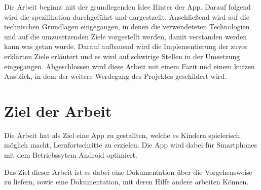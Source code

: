 Die Arbeit beginnt mit der grundlegenden Idee Hinter der App. Darauf folgend wird die spezifikation durchgeführt und dargestzellt. Anschließend wird auf die technischen Grundlagen eingegangen, in denen die verwendeteten Technologien und auf die umzusetzenden Ziele vorgestellt werden, damit verstanden werden kann was getan wurde. Darauf aufbauend wird die Implementierung der zuvor erklärten Ziele erläutert und es wird auf schwirige Stellen in der Umsetzung eingegangen. Abgeschlossen wird diese Arbeit mit einem Fazit und einem kurzen Ausblick, in dem der weitere Werdegang des Projektes geschildert wird.




\section{Ziel der Arbeit}%

Die Arbeit hat als Ziel eine App zu gestallten, welche es Kindern spielerisch möglich macht, Lernfortschritte zu erzielen. Die App wird dabei für Smartphones mit dem Betriebssytem Android optimiert.

Das Ziel dieser Arbeit ist es dabei eine Dokumentation über die Vorgehensweise zu liefern, sowie eine Dokumentation, mit deren Hilfe andere arbeiten Können.